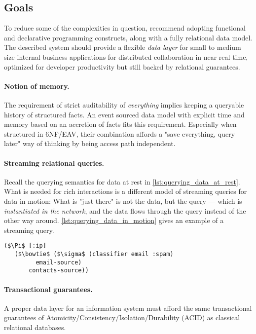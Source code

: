 \subsection{Goals}

To reduce some of the complexities in question, \cite{tarpit} recommend adopting functional and declarative programming constructs, along with a fully relational data model. The described system should provide a flexible \emph{data layer} for small to medium size internal business applications for distributed collaboration in near real time, optimized for developer productivity but still backed by relational guarantees.

\paragraph{Notion of memory.} The requirement of strict auditability of \emph{everything} implies keeping a queryable history of structured facts. An event sourced data model with explicit time and memory based on an accretion of facts fits this requirement. Especially when structured in 6NF/EAV, their combination affords a "save everything, query later" way of thinking by being access path independent.

\paragraph{Streaming relational queries.}
Recall the querying semantics for data at rest in \autoref{lst:querying_data_at_rest}. What is needed for rich interactions is a different model of streaming queries for data in motion: What is "just there" is not the data, but the query — which is \emph{instantiated in the network}, and the data flows through the query instead of the other way around. \autoref{lst:querying_data_in_motion} gives an example of a streaming query.

\begin{lstlisting}[label={lst:querying_data_in_motion},morekeywords={email-source,contacts-source},caption=Querying data in motion \cite{alvaro2015isee}]
($\Pi$ [:ip]
   ($\bowtie$ ($\sigma$ (classifier email :spam)
         email-source)
       contacts-source))
\end{lstlisting}

\paragraph{Transactional guarantees.} A proper data layer for an information system must afford the same transactional guarantees of Atomicity/Consistency/Isolation/Durability (ACID) as classical relational databases.

